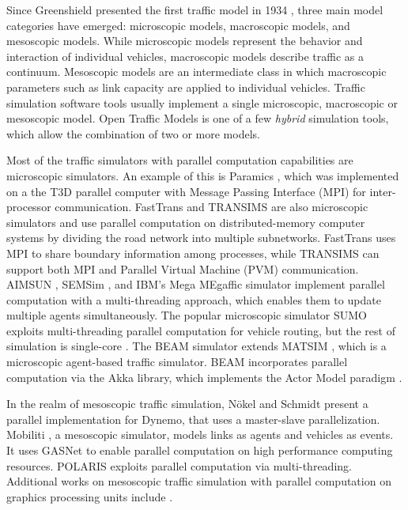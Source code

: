Since Greenshield presented the first traffic model in 1934 \cite{greenshields1934photographic}, three main model categories have emerged: microscopic models, macroscopic models, and mesoscopic models. While microscopic models represent the behavior and interaction of individual vehicles,  macroscopic models describe traffic as a continuum. Mesoscopic models are an intermediate class in which macroscopic parameters such as link capacity are applied to individual vehicles. Traffic simulation software tools usually implement a single microscopic, macroscopic or mesoscopic model. Open Traffic Models is one of a few  \textit{hybrid} simulation tools, which allow the combination of two or more models. 

Most of the traffic simulators with parallel computation capabilities are microscopic simulators. An example of this is Paramics \cite{cameron1996paramics}, which was implemented on a the T3D parallel computer with Message Passing Interface (MPI) for inter-processor communication. FastTrans \cite{thulasidasan2009accelerating} and TRANSIMS \cite{nagel2001parallel} are also microscopic simulators and use parallel computation on distributed-memory computer systems by dividing the road network into multiple subnetworks. FastTrans uses MPI to share boundary information among processes, while TRANSIMS can support both MPI and Parallel Virtual Machine (PVM) communication. AIMSUN \cite{ferrer1993aimsun2}, SEMSim \cite{aydt2013multi}, and IBM's Mega MEgaffic simulator \cite{osogami2012research} implement parallel computation with a multi-threading approach, which enables them to update multiple agents simultaneously. The popular microscopic simulator SUMO
exploits multi-threading parallel computation for vehicle routing, but the rest of simulation is single-core \cite{behrisch2011sumo}.
The BEAM simulator \cite{aboutBeam} extends MATSIM \cite{horni2016multi}, which is a microscopic agent-based traffic simulator. BEAM incorporates parallel computation via the Akka \cite{akka} library, which implements the Actor Model paradigm \cite{actorModel}. 

In the realm of mesoscopic traffic simulation, N{\"o}kel and Schmidt present a parallel implementation for Dynemo, that uses a master-slave parallelization. Mobiliti \cite{chan2018mobiliti}, a mesoscopic simulator, models links as agents and vehicles as events. It uses GASNet \cite{gasnet} to enable parallel computation on high performance computing resources. POLARIS  \cite{auld2016polaris} exploits parallel computation via multi-threading. Additional works on mesoscopic traffic simulation with parallel computation on graphics processing units include \cite{xu2014mesoscopic,song2017supporting,strippgen2009multi}. 

